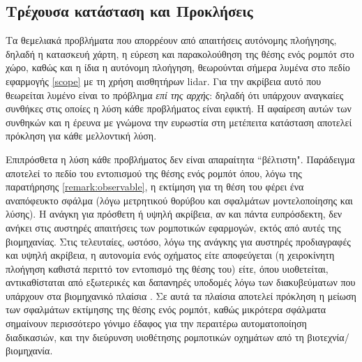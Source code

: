 

\subsection{Τρέχουσα κατάσταση και Προκλήσεις}
\label{subsec:01_01_01_3}

Τα θεμελιακά προβλήματα που απορρέουν από απαιτήσεις αυτόνομης πλοήγησης,
δηλαδή η κατασκευή χάρτη, η εύρεση και παρακολούθηση της θέσης ενός ρομπότ στο
χώρο, καθώς και η ίδια η αυτόνομη πλοήγηση, θεωρούνται σήμερα λυμένα στο πεδίο
εφαρμογής \ref{scope} με τη χρήση αισθητήρων lidar. Για την ακρίβεια αυτό που
θεωρείται λυμένο είναι το πρόβλημα \textit{επί της αρχής}: δηλαδή ότι υπάρχουν
αναγκαίες συνθήκες στις οποίες η λύση κάθε προβλήματος είναι εφικτή.  Η
αφαίρεση αυτών των συνθηκών και η έρευνα με γνώμονα την ευρωστία στη μετέπειτα
κατάσταση αποτελεί πρόκληση για κάθε μελλοντική λύση.

Επιπρόσθετα η λύση κάθε προβλήματος δεν είναι απαραίτητα ``βέλτιστη".
Παράδειγμα αποτελεί το πεδίο του εντοπισμού της θέσης ενός ρομπότ όπου, λόγω
της παρατήρησης \ref{remark:observable}, η εκτίμηση για τη θέση του φέρει ένα
αναπόφευκτο σφάλμα (λόγω μετρητικού θορύβου και σφαλμάτων μοντελοποίησης και
λύσης).  H ανάγκη για πρόσθετη ή υψηλή ακρίβεια, αν και πάντα ευπρόσδεκτη, δεν
ανήκει στις αυστηρές απαιτήσεις των ρομποτικών εφαρμογών, εκτός από αυτές της
βιομηχανίας.  Στις τελευταίες, ωστόσο, λόγω της ανάγκης για αυστηρές
προδιαγραφές και υψηλή ακρίβεια, η αυτονομία ενός οχήματος είτε αποφεύγεται
(η χειροκίνητη πλοήγηση καθιστά περιττό τον εντοπισμό της θέσης του) είτε,
όπου υιοθετείται, αντικαθίσταται από εξωτερικές και δαπανηρές υποδομές λόγω των
διακυβεύματων που υπάρχουν στα βιομηχανικό πλαίσια \cite{Vasiljevic2016a}. Σε
αυτά τα πλαίσια αποτελεί πρόκληση η μείωση των σφαλμάτων εκτίμησης της θέσης
ενός ρομπότ, καθώς μικρότερα σφάλματα σημαίνουν περισσότερο γόνιμο έδαφος για
την περαιτέρω αυτοματοποίηση διαδικασιών, και την διεύρυνση υιοθέτησης
ρομποτικών οχημάτων από τη βιοτεχνία/βιομηχανία.
